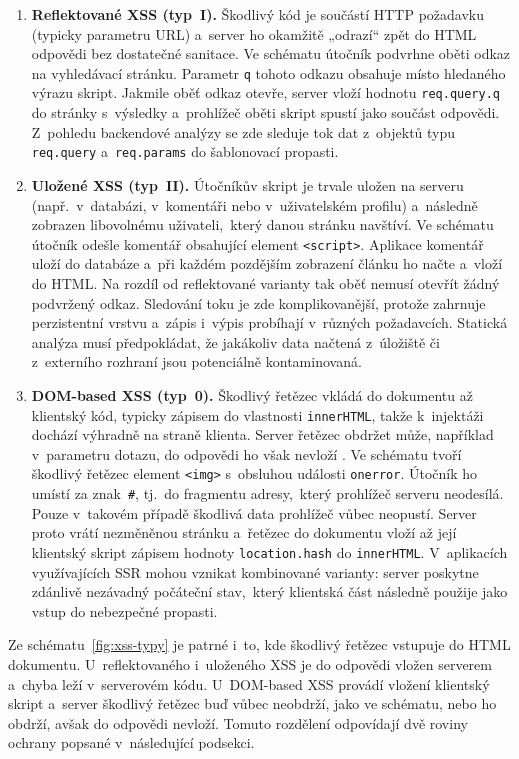 \FloatBarrier
\begin{enumerate}
    \item \textbf{Reflektované XSS (typ~I).} Škodlivý kód je součástí HTTP požadavku (typicky parametru URL) a~server ho okamžitě „odrazí“ zpět do HTML odpovědi bez dostatečné sanitace. Ve schématu útočník podvrhne oběti odkaz na vyhledávací stránku. Parametr \texttt{q} tohoto odkazu obsahuje místo hledaného výrazu skript. Jakmile oběť odkaz otevře, server vloží hodnotu \texttt{req.query.q} do stránky s~výsledky a~prohlížeč oběti skript spustí jako součást odpovědi. Z~pohledu backendové analýzy se zde sleduje tok dat z~objektů typu \texttt{req.query} a~\texttt{req.params} do šablonovací propasti.
    \item \textbf{Uložené XSS (typ~II).} Útočníkův skript je trvale uložen na serveru (např.~v~databázi, v~komentáři nebo v~uživatelském profilu) a~následně zobrazen libovolnému uživateli,~který danou stránku navštíví. Ve schématu útočník odešle komentář obsahující element \texttt{<script>}. Aplikace komentář uloží do databáze a~při každém pozdějším zobrazení článku ho načte a~vloží do HTML. Na rozdíl od reflektované varianty tak oběť nemusí otevřít žádný podvržený odkaz. Sledování toku je zde komplikovanější, protože zahrnuje perzistentní vrstvu a~zápis i~výpis probíhají v~různých požadavcích. Statická analýza musí předpokládat, že jakákoliv data načtená z~úložiště či z~externího rozhraní jsou potenciálně kontaminovaná.
    \item \textbf{DOM-based XSS (typ~0).} Škodlivý řetězec vkládá do dokumentu až klientský kód, typicky zápisem do vlastnosti \texttt{innerHTML}, takže k~injektáži dochází výhradně na straně klienta. Server řetězec obdržet může, například v~parametru dotazu, do odpovědi ho však nevloží \parencite{klein2005domxss}. Ve schématu tvoří škodlivý řetězec element \texttt{<img>} s~obsluhou události \texttt{onerror}. Útočník ho umístí za znak~\texttt{\#}, tj.~do fragmentu adresy,~který prohlížeč serveru neodesílá. Pouze v~takovém případě škodlivá data prohlížeč vůbec neopustí. Server proto vrátí nezměněnou stránku a~řetězec do dokumentu vloží až její klientský skript zápisem hodnoty \texttt{location.hash} do \texttt{innerHTML}. V~aplikacích využívajících SSR mohou vznikat kombinované varianty: server poskytne zdánlivě nezávadný počáteční stav,~který klientská část následně použije jako vstup do nebezpečné propasti.
\end{enumerate}

Ze schématu~\ref{fig:xss-typy} je patrné i~to, kde škodlivý řetězec vstupuje do HTML dokumentu. U~reflektovaného i~uloženého XSS je do odpovědi vložen serverem a~chyba leží v~serverovém kódu. U~DOM-based XSS provádí vložení klientský skript a~server škodlivý řetězec buď vůbec neobdrží, jako ve schématu, nebo ho obdrží, avšak do odpovědi nevloží. Tomuto rozdělení odpovídají dvě roviny ochrany popsané v~následující podsekci.

